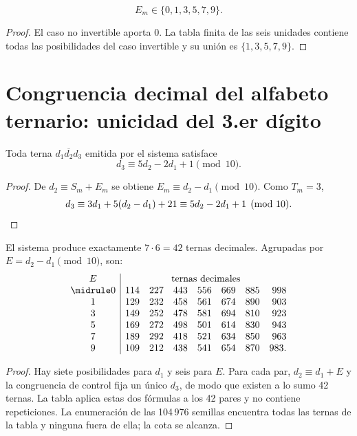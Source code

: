 \begin{lemma}
\[
E_m\in\{0,1,3,5,7,9\}.
\]
\end{lemma}
\begin{proof}
El caso no invertible aporta \(0\). La tabla finita de las seis unidades
contiene todas las posibilidades del caso invertible y su unión es
\(\{1,3,5,7,9\}\).
\end{proof}

\section{Congruencia decimal del alfabeto ternario: unicidad del 3.er dígito}

\begin{theorem}
Toda terna \(\overline{d_1d_2d_3}\) emitida por el sistema satisface
\[
\boxed{d_3\equiv5d_2-2d_1+1\pmod{10}.}
\]
\end{theorem}
\begin{proof}
De \(d_2\equiv S_m+E_m\) se obtiene
\(E_m\equiv d_2-d_1\pmod{10}\). Como \(T_m=3\),
\[
d_3\equiv3d_1+5(d_2-d_1)+21
\equiv5d_2-2d_1+1\pmod{10}.\qedhere
\]
\end{proof}

\begin{theorem}
El sistema produce exactamente \(7\cdot6=42\) ternas decimales. Agrupadas por
\(E=d_2-d_1\pmod{10}\), son:
\[
\begin{array}{c|rrrrrrr}
E&\multicolumn{7}{c}{\text{ternas decimales}}\\
\midrule
0&114&227&443&556&669&885&998\\
1&129&232&458&561&674&890&903\\
3&149&252&478&581&694&810&923\\
5&169&272&498&501&614&830&943\\
7&189&292&418&521&634&850&963\\
9&109&212&438&541&654&870&983.
\end{array}
\]
\end{theorem}
\begin{proof}
Hay siete posibilidades para \(d_1\) y seis para \(E\). Para cada par,
\(d_2\equiv d_1+E\) y la congruencia de control fija un único \(d_3\),
de modo que existen a lo sumo 42 ternas. La tabla aplica estas dos fórmulas
a los 42 pares y no contiene repeticiones. La enumeración de las
104\,976 semillas encuentra todas las ternas de la tabla y ninguna fuera de
ella; la cota se alcanza.
\end{proof}

